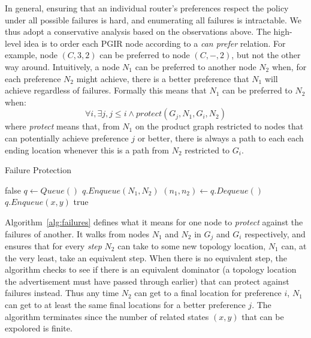 In general, ensuring that an individual router's preferences respect the policy under all possible failures is hard, and enumerating all failures is intractable. We thus adopt a conservative analysis based on the observations above. The high-level idea is to order each PGIR node according to a \textit{can prefer} relation. For example, node $(C,3,2)$ can be preferred to node $(C,-,2)$, but not the other way around. Intuitively, a node $N_1$ can be preferred to another node $N_2$ when, for each preference $N_2$ might achieve, there is a better preference that $N_1$ will achieve regardless of failures. Formally this means that $N_1$ can be preferred to $N_2$ when:
%
$$\forall i, \exists j, j \leq i \wedge protect(G_j, N_1, G_i, N_2)$$
%
where \textit{protect} means that, from $N_1$ on the product graph restricted to nodes that can potentially achieve preference $j$ or better, 
there is always a path to each each ending location whenever this is a path from $N_2$ restricted to $G_i$.

\begin{algorithm}[t!]
\caption{Failure Protection}
\label{alg:failures}
\begin{algorithmic}[1]
   \Return false
  \EndIf
  \State $q \gets Queue()$
  \State $q.Enqueue (N_1, N_2)$
    \State $(n_1,n_2) \gets q.Dequeue()$
          \State $q.Enqueue(x,y)$
        \EndIf
      \EndIf
    \EndFor
  \EndWhile
  \Return true
  \EndProcedure
\end{algorithmic}
\end{algorithm}

Algorithm~\ref{alg:failures} defines what it means for one node to \textit{protect} against the failures of another. It walks from nodes $N_1$ and $N_2$ in $G_j$ and $G_i$ respectively, and ensures that for every \textit{step} $N_2$ can take to some new topology location, $N_1$ can, at the very least, take an equivalent step. 
When there is no equivalent step, the algorithm checks to see if there is an equivalent dominator (a topology location the advertisement must have passed through earlier) that can protect against failures instead.
Thus any time $N_2$ can get to a final location for preference $i$, $N_1$ can get to at least the same final locations for a better preference $j$. The algorithm terminates since the number of related states $(x,y)$ that can be expolored is finite.

